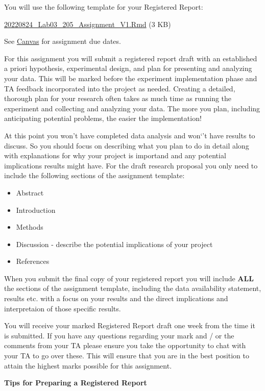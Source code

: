 \documentclass[
]{book}
\providecommand{\tightlist}{%
  \setlength{\itemsep}{0pt}\setlength{\parskip}{0pt}}
\begin{document}
You will use the following template for your Registered Report:

\href{}{20220824\_Lab03\_205\_Assignment\_V1.Rmd} (3 KB)

See \href{https://canvas.ubc.ca}{Canvas} for assignment due dates.

For this assignment you will submit a registered report draft with an established a priori hypothesis, experimental design, and plan for presenting and analyzing your data. This will be marked before the experiment implementation phase and TA feedback incorporated into the project as needed. Creating a detailed, thorough plan for your research often takes as much time as running the experiment and collecting and analyzing your data. The more you plan, including anticipating potential problems, the easier the implementation!

At this point you won't have completed data analysis and won`'t have results to discuss. So you should focus on describing what you plan to do in detail along with explanations for why your project is importand and any potential implications results might have. For the draft research proposal you only need to include the following sections of the assignment template:

\begin{itemize}
\tightlist
\item
  Abstract
\item
  Introduction
\item
  Methods
\item
  Discussion - describe the potential implications of your project
\item
  References
\end{itemize}

When you submit the final copy of your registered report you will include \textbf{ALL} the sections of the assignment template, including the data availability statement, results etc. with a focus on your results and the direct implications and interpretaion of those specific results.

You will receive your marked Registered Report draft one week from the time it is submitted. If you have any questions regarding your mark and / or the comments from your TA please ensure you take the opportunity to chat with your TA to go over these. This will ensure that you are in the best position to attain the highest marks possible for this assignment.

\textbf{Tips for Preparing a Registered Report}
\end{document}
